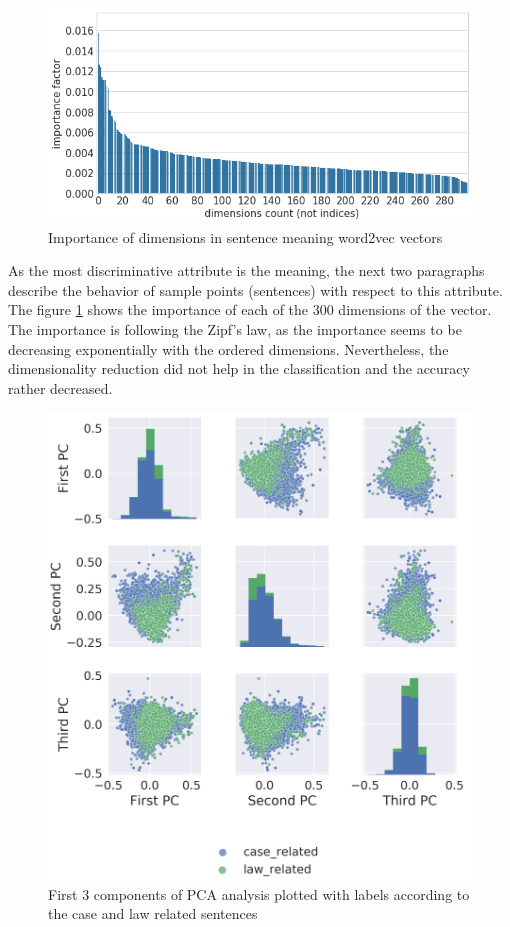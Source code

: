 \documentclass[
  digital, %
  notable,   %
  nolof,     %
  nolot,     %
  draft
]{fithesis3}
\begin{document}
\begin{figure}[h]
\caption{Importance of dimensions in sentence meaning word2vec vectors}
\label{fig:vec_importance_caselaw}
\includegraphics[width=\textwidth]{img/vec_importance_caselaw}
\end{figure}

As the most discriminative attribute is the meaning, the next two paragraphs describe the behavior of sample points (sentences) with respect to this attribute.
The figure \ref{fig:vec_importance_caselaw} shows the importance of each of the 300 dimensions of the vector.
The importance is following the Zipf's law, as the importance seems to be decreasing exponentially with the ordered dimensions.
Nevertheless, the dimensionality reduction did not help in the classification and the accuracy rather decreased.

\begin{figure}[h]
\caption{First 3 components of PCA analysis plotted with labels according to the case and law related sentences}
\label{fig:PCA_caselaw}
\includegraphics[width=\textwidth]{img/PCA_caselaw}
\end{figure}
\end{document}
